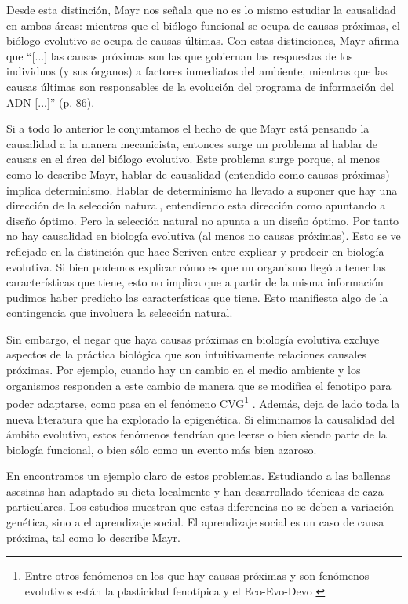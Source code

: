 Desde esta distinción, Mayr nos señala que no es lo mismo estudiar la causalidad en ambas áreas: mientras que el biólogo funcional se ocupa de causas próximas, el biólogo evolutivo se ocupa de causas últimas. Con estas distinciones, Mayr afirma que ``[...] las causas próximas son las que gobiernan las respuestas de los individuos (y sus órganos) a factores inmediatos del ambiente, mientras que las causas últimas son responsables de la evolución del programa de información del ADN [...]'' (p. 86).

Si a todo lo anterior le conjuntamos el hecho de que Mayr está pensando la causalidad a la manera mecanicista, entonces surge un problema al hablar de causas en el área del biólogo evolutivo. Este problema surge porque, al menos como lo describe Mayr, hablar de causalidad (entendido como causas próximas) implica determinismo. Hablar de determinismo ha llevado a suponer que hay una dirección de la selección natural, entendiendo esta dirección como apuntando a diseño óptimo. Pero la selección natural no apunta a un diseño óptimo. Por tanto no hay causalidad en biología evolutiva (al menos no causas próximas). Esto se ve reflejado en la distinción que hace Scriven \citeyear{Scriven1959} entre explicar y predecir en biología evolutiva. Si bien podemos explicar cómo es que un organismo llegó a tener las características que tiene, esto no implica que a partir de la misma información pudimos haber predicho las características que tiene. Esto manifiesta algo de la contingencia que involucra la selección natural.

Sin embargo, el negar que haya causas próximas en biología evolutiva excluye aspectos de la práctica biológica que son intuitivamente relaciones causales próximas. Por ejemplo, cuando hay un cambio en el medio ambiente y los organismos responden a este cambio de manera que se modifica el fenotipo para poder adaptarse, como pasa en el fenómeno CVG\footnote{Entre otros fenómenos en los que hay causas próximas y son fenómenos evolutivos están la plasticidad fenotípica \cite{WESTEBERHARD20082701} y el Eco-Evo-Devo \cite{PfenningEco-Evo-Devo}} \cite{CVG}. Además, deja de lado toda la nueva literatura que ha explorado la epigenética. Si eliminamos la causalidad del ámbito evolutivo, estos fenómenos tendrían que leerse o bien siendo parte de la biología funcional, o bien sólo como un evento más bien azaroso.

En \cite{Uller2019} encontramos un ejemplo claro de estos problemas. Estudiando a las ballenas asesinas han adaptado su dieta localmente y han desarrollado técnicas de caza particulares. Los estudios muestran que estas diferencias no se deben a variación genética, sino a el aprendizaje social. El aprendizaje social es un caso de causa próxima, tal como lo describe Mayr.

